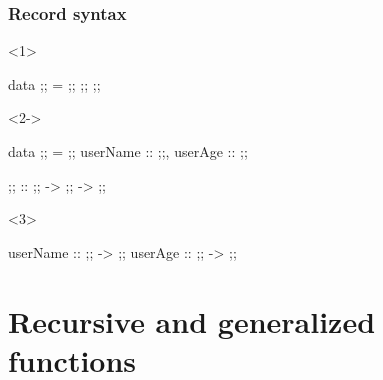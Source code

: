 \documentclass[17pt]{beamer}
\renewcommand{\(}[1]{\begin{columns}[#1]}
\renewcommand{\)}{\end{columns}}
\newcommand{\<}[1]{\begin{column}{#1}}
\renewcommand{\>}{\end{column}}
\begin{document}
\begin{frame}[fragile]
\frametitle{Record syntax}
\begin{minipage}[t][0.4\textheight]{1.0\linewidth}
\begin{onlyenv}<1>
\begin{code}
          data ;; = ;; ;; ;;
\end{code}
\end{onlyenv}
\begin{onlyenv}<2->
\begin{code}
          data ;; = ;; {
              userName :: ;;,
              userAge  :: ;;
          }
\end{code}
\end{onlyenv}
\end{minipage}
\begin{code}
          ;;     :: ;; -> ;; -> ;;
\end{code}
\begin{uncoverenv}<3>
\begin{code}
          userName :: ;; -> ;;
          userAge  :: ;; -> ;;
\end{code}
\end{uncoverenv}
\end{frame}



\section{Recursive and generalized functions}
\end{document}
